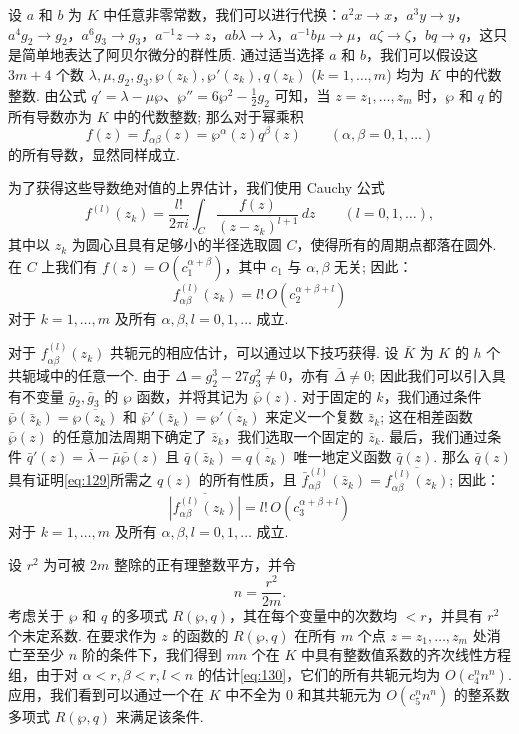 设 $a$ 和 $b$ 为 $K$ 中任意非零常数，我们可以进行代换：$a^2 x \to x$，$a^3 y \to y$，$a^4 g_2 \to g_2$，$a^6 g_3 \to g_3$，$a^{-1} z \to z$，$ab \lambda \to \lambda$，$a^{-1} b \mu \to \mu$，$a \zeta \to \zeta$，$b q \to q$，这只是简单地表达了阿贝尔微分的群性质. 通过适当选择 $a$ 和 $b$，我们可以假设这 $3m+4$ 个数 $\lambda, \mu, g_2, g_3, \wp(z_k), \wp'(z_k), q(z_k)$ ($k=1, \dots, m$) 均为 $K$ 中的代数整数. 由公式 $q' = \lambda - \mu \wp$、$\wp'' = 6 \wp^2 - \frac{1}{2} g_2$ 可知，当 $z = z_1, \dots, z_m$ 时，$\wp$ 和 $q$ 的所有导数亦为 $K$ 中的代数整数; 那么对于幂乘积
\[
f(z) = f_{\alpha\beta}(z) = \wp^{\alpha}(z)q^{\beta}(z) \qquad (\alpha, \beta=0,1,\dots)
\]
的所有导数，显然同样成立.

为了获得这些导数绝对值的上界估计，我们使用 Cauchy 公式
\[
f^{(l)}(z_k) = \frac{l!}{2\pi i} \int_C \frac{f(z)}{(z-z_k)^{l+1}} \, dz \qquad (l=0,1,\dots),
\]
其中以 $z_k$ 为圆心且具有足够小的半径选取圆 $C$，使得所有的周期点都落在圆外. 在 $C$ 上我们有 $f(z) = O(c_1^{\alpha+\beta})$，其中 $c_1$ 与 $\alpha, \beta$ 无关; 因此：
\begin{equation}
f_{\alpha\beta}^{(l)}(z_k) = l! \, O(c_2^{\alpha+\beta+l}) \tag{129}\label{eq:129}
\end{equation}
对于 $k=1, \dots, m$ 及所有 $\alpha, \beta, l = 0, 1, \dots$ 成立.

对于 $f_{\alpha\beta}^{(l)}(z_k)$ 共轭元的相应估计，可以通过以下技巧获得. 设 $\bar{K}$ 为 $K$ 的 $h$ 个共轭域中的任意一个. 由于 $\Delta = g_2^3 - 27g_3^2 \neq 0$，亦有 $\bar{\Delta} \neq 0$; 因此我们可以引入具有不变量 $\bar{g}_2, \bar{g}_3$ 的 $\wp$ 函数，并将其记为 $\bar{\wp}(z)$. 对于固定的 $k$，我们通过条件 $\bar{\wp}(\bar{z}_k) = \overline{\wp(z_k)}$ 和 $\bar{\wp}'(\bar{z}_k) = \overline{\wp'(z_k)}$ 来定义一个复数 $\bar{z}_k$; 这在相差函数 $\bar{\wp}(z)$ 的任意加法周期下确定了 $\bar{z}_k$，我们选取一个固定的 $\bar{z}_k$. 最后，我们通过条件 $\bar{q}'(z) = \bar{\lambda} - \bar{\mu} \bar{\wp}(z)$ 且 $\bar{q}(\bar{z}_k) = \overline{q(z_k)}$ 唯一地定义函数 $\bar{q}(z)$. 那么 $\bar{q}(z)$ 具有证明\eqref{eq:129}所需之 $q(z)$ 的所有性质，且 $\bar{f}_{\alpha\beta}^{(l)}(\bar{z}_k) = \overline{f_{\alpha\beta}^{(l)}(z_k)}$; 因此：
\begin{equation}
\overline{|f_{\alpha\beta}^{(l)}(z_k)|} = l! \, O(c_3^{\alpha+\beta+l}) \tag{130}\label{eq:130}
\end{equation}
对于 $k=1, \dots, m$ 及所有 $\alpha, \beta, l = 0, 1, \dots$ 成立.

设 $r^2$ 为可被 $2m$ 整除的正有理整数平方，并令
\[
n = \frac{r^2}{2m}.
\]
考虑关于 $\wp$ 和 $q$ 的多项式 $R(\wp, q)$，其在每个变量中的次数均 $< r$，并具有 $r^2$ 个未定系数. 在要求作为 $z$ 的函数的 $R(\wp, q)$ 在所有 $m$ 个点 $z = z_1, \dots, z_m$ 处消亡至至少 $n$ 阶的条件下，我们得到 $mn$ 个在 $K$ 中具有整数值系数的齐次线性方程组，由于对 $\alpha < r, \beta < r, l < n$ 的估计\eqref{eq:130}，它们的所有共轭元均为 $O(c_4^n n^n)$. 应用，我们看到可以通过一个在 $K$ 中不全为 $0$ 和其共轭元为 $O(c_5^n n^n)$ 的整系数多项式 $R(\wp, q)$ 来满足该条件.

